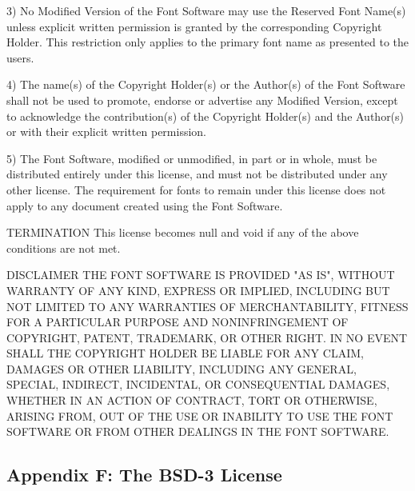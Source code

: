 \begin{DoxyCode}
3) No Modified Version of the Font Software may use the Reserved Font
Name(s) unless explicit written permission is granted by the corresponding
Copyright Holder. This restriction only applies to the primary font name as
presented to the users.

4) The name(s) of the Copyright Holder(s) or the Author(s) of the Font
Software shall not be used to promote, endorse or advertise any
Modified Version, except to acknowledge the contribution(s) of the
Copyright Holder(s) and the Author(s) or with their explicit written
permission.

5) The Font Software, modified or unmodified, in part or in whole,
must be distributed entirely under this license, and must not be
distributed under any other license. The requirement for fonts to
remain under this license does not apply to any document created
using the Font Software.

TERMINATION
This license becomes null and void if any of the above conditions are
not met.

DISCLAIMER
THE FONT SOFTWARE IS PROVIDED "AS IS", WITHOUT WARRANTY OF ANY KIND,
EXPRESS OR IMPLIED, INCLUDING BUT NOT LIMITED TO ANY WARRANTIES OF
MERCHANTABILITY, FITNESS FOR A PARTICULAR PURPOSE AND NONINFRINGEMENT
OF COPYRIGHT, PATENT, TRADEMARK, OR OTHER RIGHT. IN NO EVENT SHALL THE
COPYRIGHT HOLDER BE LIABLE FOR ANY CLAIM, DAMAGES OR OTHER LIABILITY,
INCLUDING ANY GENERAL, SPECIAL, INDIRECT, INCIDENTAL, OR CONSEQUENTIAL
DAMAGES, WHETHER IN AN ACTION OF CONTRACT, TORT OR OTHERWISE, ARISING
FROM, OUT OF THE USE OR INABILITY TO USE THE FONT SOFTWARE OR FROM
OTHER DEALINGS IN THE FONT SOFTWARE.
\end{DoxyCode}


\subsection*{Appendix F\+: The B\+S\+D-\/3 License }


